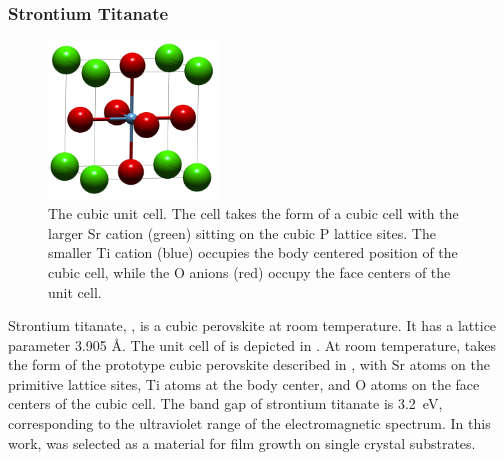 \subsubsection{Strontium Titanate}\label{subsubsec:background.sto}

\begin{figure}
\begin{center}
\includegraphics[width=0.4\textwidth]{stocell.png}
\caption[Cubic  unit cell]{%
	The cubic  unit cell. The cell takes the form of a 
	cubic cell with the larger Sr cation (green) sitting on the 
	cubic P lattice sites. The smaller Ti cation (blue) occupies 
	the body centered position of the cubic cell, while the O anions 
	(red) occupy the face centers of the unit cell.}
\label{fig:stocell}
\end{center}
\end{figure}

Strontium titanate, , is a cubic perovskite at room temperature. It has a
lattice parameter 3.905 \si{\angstrom}. The unit cell of  is depicted in
. At room temperature,  takes the form of the prototype
cubic perovskite described in , with Sr atoms on
the primitive lattice sites, Ti atoms at the body center, and O atoms on the face centers
of the cubic cell. The band gap of strontium titanate is 3.2~eV,\cite{Cardona:1965vw}
corresponding to the ultraviolet range of the electromagnetic spectrum. In this work,
 was selected as a material for  film growth on single crystal
substrates. 
 
